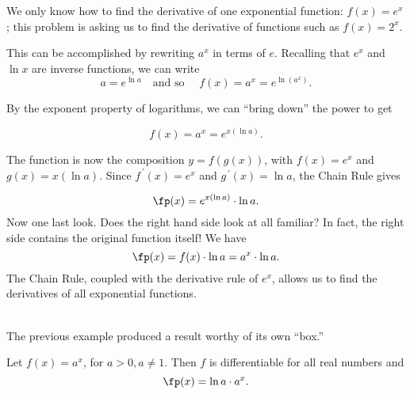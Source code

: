{We only know how to find the derivative of one exponential function: $f(x) = e^x$; this problem is asking us to find the derivative of functions such as $f(x) = 2^x$. 

This can be accomplished by rewriting $a^x$ in terms of $e$.  Recalling that $e^x$ and $\ln x$ are inverse functions, we can write
$$
a = e^{\ln a} \quad \text{and so } \quad f(x) = a^x = e^{\ln (a^x)}.
$$  

By the exponent property of logarithms, we can ``bring down'' the power to get 

$$
f(x) = a^x = e^{x (\ln a)}.
$$

The function is now the composition $y=f(g(x))$, with $f(x) = e^x$ and $g(x) = x(\ln a)$.  Since $f^{\, \prime}(x) = e^x$ and $g^{\, \prime}(x) = \ln a$, the Chain Rule  gives 

$$
\fp(x) = e^{x (\ln a)} \cdot \ln a.
$$
Now one last look.  Does the right hand side look at all familiar?  In fact, the right side contains the original function itself! We have
$$
\fp(x) = f(x) \cdot \ln a = a^x\cdot \ln a.
$$
The Chain Rule, coupled with the derivative rule of $e^x$, allows us to find the derivatives of all exponential functions.
}\\

The previous example produced a result worthy of its own ``box.''

{Let $f(x)=a^x$, for $a>0, a\neq 1$. Then $f$ is differentiable for all real numbers and $$\fp(x) = \ln a\cdot a^x.$$
}

